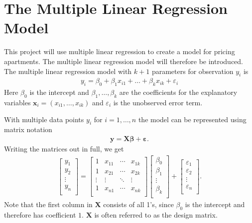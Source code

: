 \section{The Multiple Linear Regression Model}

This project will use multiple linear regression to create a model for pricing apartments. The multiple linear regression model will therefore be introduced. The multiple linear regression model with $k+1$ parameters for observation $y_i$ is
\begin{align}\label{eq:multiple_linear_regression}
  y_i = \beta_0 + \beta_1 x_{i1} + \ldots + \beta_k x_{ik} + \varepsilon_i
\end{align}
Here $\beta_0$ is the intercept and $\beta_1, \ldots, \beta_k$ are the coefficients for the explanatory variables $\textbf{x}_i = (x_{i1}, \ldots, x_{ik})$ and $\varepsilon_i$ is the unobserved error term.

With multiple data points $y_i$ for $i = 1, \ldots, n$ the model can be represented using matrix notation
\begin{align}\label{eq:multiple_linear_regression_model}
    \mathbf{y} = \mathbf{X} \boldsymbol{\beta} + \boldsymbol{\varepsilon}.
\end{align}
Writing the matrices out in full, we get
\begin{align}
  \begin{bmatrix}
    y_1 \\ y_2 \\ \vdots \\ y_n \\
  \end{bmatrix}
  =
  \begin{bmatrix}
    1 & x_{11} & \cdots & x_{1k} \\
    1 & x_{21} & \cdots & x_{2k} \\ \vdots & \vdots & \ddots & \vdots \\ 1 & x_{n1} & \cdots & x_{nk} \\
  \end{bmatrix}
  \begin{bmatrix}
    \beta_0 \\ \beta_1 \\ \vdots \\ \beta_k \\
  \end{bmatrix} +
  \begin{bmatrix}
    \varepsilon_1 \\ \varepsilon_2 \\ \vdots \\ \varepsilon_n \\
  \end{bmatrix}.
\end{align}
Note that the first column  in $\boldsymbol{X}$ consists of all 1's, since $\beta_{0}$ is the intercept and therefore has coefficient $1$. $\textbf{X}$ is often referred to as the design matrix. 

